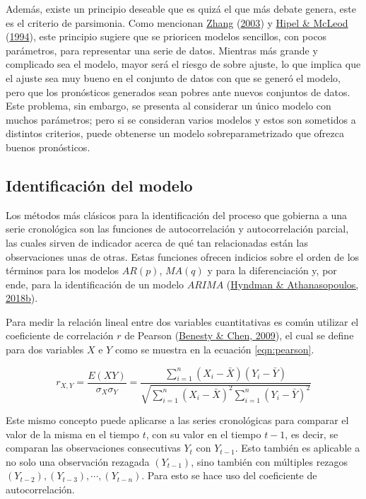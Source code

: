 \documentclass[
]{article}
\begin{document}
Además, existe un principio deseable que es quizá el que más debate
genera, este es el criterio de parsimonia. Como mencionan
\protect\hyperlink{ref-Zhang}{Zhang}
(\protect\hyperlink{ref-Zhang}{2003}) y
\protect\hyperlink{ref-Hipel}{Hipel \& McLeod}
(\protect\hyperlink{ref-Hipel}{1994}), este principio sugiere que se
prioricen modelos sencillos, con pocos parámetros, para representar una
serie de datos. Mientras más grande y complicado sea el modelo, mayor
será el riesgo de sobre ajuste, lo que implica que el ajuste sea muy
bueno en el conjunto de datos con que se generó el modelo, pero que los
pronósticos generados sean pobres ante nuevos conjuntos de datos. Este
problema, sin embargo, se presenta al considerar un único modelo con
muchos parámetros; pero si se consideran varios modelos y estos son
sometidos a distintos criterios, puede obtenerse un modelo
sobreparametrizado que ofrezca buenos pronósticos.

\subsection{Identificación del modelo}

Los métodos más clásicos para la identificación del proceso que gobierna
a una serie cronológica son las funciones de autocorrelación y
autocorrelación parcial, las cuales sirven de indicador acerca de qué
tan relacionadas están las observaciones unas de otras. Estas funciones
ofrecen indicios sobre el orden de los términos para los modelos
\(AR(p)\), \(MA(q)\) y para la diferenciación y, por ende, para la
identificación de un modelo \(ARIMA\)
(\protect\hyperlink{ref-hyndman_box-jenkins}{Hyndman \& Athanasopoulos,
2018b}).

Para medir la relación lineal entre dos variables cuantitativas es común
utilizar el coeficiente de correlación \(r\) de Pearson
(\protect\hyperlink{ref-pearson}{Benesty \& Chen, 2009}), el cual se
define para dos variables \(X\) e \(Y\) como se muestra en la ecuación
\ref{eqn:pearson}.

\begin{equation}
\label{eqn:pearson}
r_{X,Y}=\frac{E(XY)}{\sigma_X \sigma_Y} = \frac{\sum_{i=1}^n \left(X_i- \bar X\right) \left(Y_i- \bar Y\right)}{\sqrt{\sum_{i=1}^n \left(X_i- \bar X\right)^2 \sum_{i=1}^n \left(Y_i- \bar Y\right)^2}}
\end{equation}

Este mismo concepto puede aplicarse a las series cronológicas para
comparar el valor de la misma en el tiempo \(t\), con su valor en el
tiempo \(t-1\), es decir, se comparan las observaciones consecutivas
\(Y_t\) con \(Y_{t-1}\). Esto también es aplicable a no solo una
observación rezagada \((Y_{t-1})\), sino también con múltiples rezagos
\((Y_{t-2}), (Y_{t-3}), \cdots,(Y_{t-n})\). Para esto se hace uso del
coeficiente de autocorrelación.
\end{document}
